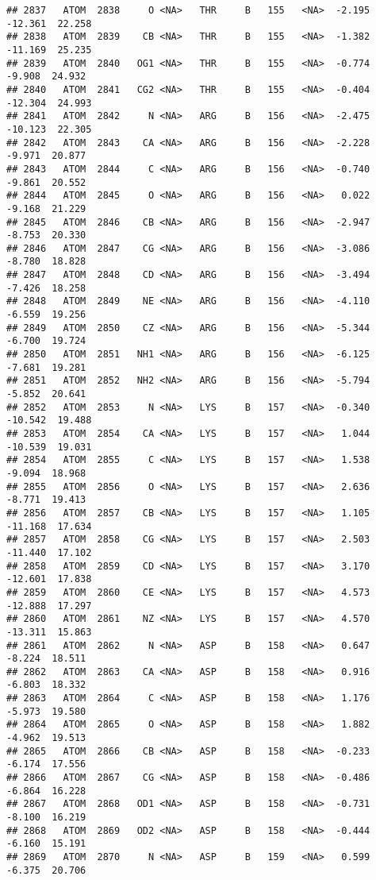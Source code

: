 \documentclass[
]{article}
\begin{document}
\begin{verbatim}
## 2837   ATOM  2838     O <NA>   THR     B   155   <NA>  -2.195 -12.361  22.258
## 2838   ATOM  2839    CB <NA>   THR     B   155   <NA>  -1.382 -11.169  25.235
## 2839   ATOM  2840   OG1 <NA>   THR     B   155   <NA>  -0.774  -9.908  24.932
## 2840   ATOM  2841   CG2 <NA>   THR     B   155   <NA>  -0.404 -12.304  24.993
## 2841   ATOM  2842     N <NA>   ARG     B   156   <NA>  -2.475 -10.123  22.305
## 2842   ATOM  2843    CA <NA>   ARG     B   156   <NA>  -2.228  -9.971  20.877
## 2843   ATOM  2844     C <NA>   ARG     B   156   <NA>  -0.740  -9.861  20.552
## 2844   ATOM  2845     O <NA>   ARG     B   156   <NA>   0.022  -9.168  21.229
## 2845   ATOM  2846    CB <NA>   ARG     B   156   <NA>  -2.947  -8.753  20.330
## 2846   ATOM  2847    CG <NA>   ARG     B   156   <NA>  -3.086  -8.780  18.828
## 2847   ATOM  2848    CD <NA>   ARG     B   156   <NA>  -3.494  -7.426  18.258
## 2848   ATOM  2849    NE <NA>   ARG     B   156   <NA>  -4.110  -6.559  19.256
## 2849   ATOM  2850    CZ <NA>   ARG     B   156   <NA>  -5.344  -6.700  19.724
## 2850   ATOM  2851   NH1 <NA>   ARG     B   156   <NA>  -6.125  -7.681  19.281
## 2851   ATOM  2852   NH2 <NA>   ARG     B   156   <NA>  -5.794  -5.852  20.641
## 2852   ATOM  2853     N <NA>   LYS     B   157   <NA>  -0.340 -10.542  19.488
## 2853   ATOM  2854    CA <NA>   LYS     B   157   <NA>   1.044 -10.539  19.031
## 2854   ATOM  2855     C <NA>   LYS     B   157   <NA>   1.538  -9.094  18.968
## 2855   ATOM  2856     O <NA>   LYS     B   157   <NA>   2.636  -8.771  19.413
## 2856   ATOM  2857    CB <NA>   LYS     B   157   <NA>   1.105 -11.168  17.634
## 2857   ATOM  2858    CG <NA>   LYS     B   157   <NA>   2.503 -11.440  17.102
## 2858   ATOM  2859    CD <NA>   LYS     B   157   <NA>   3.170 -12.601  17.838
## 2859   ATOM  2860    CE <NA>   LYS     B   157   <NA>   4.573 -12.888  17.297
## 2860   ATOM  2861    NZ <NA>   LYS     B   157   <NA>   4.570 -13.311  15.863
## 2861   ATOM  2862     N <NA>   ASP     B   158   <NA>   0.647  -8.224  18.511
## 2862   ATOM  2863    CA <NA>   ASP     B   158   <NA>   0.916  -6.803  18.332
## 2863   ATOM  2864     C <NA>   ASP     B   158   <NA>   1.176  -5.973  19.580
## 2864   ATOM  2865     O <NA>   ASP     B   158   <NA>   1.882  -4.962  19.513
## 2865   ATOM  2866    CB <NA>   ASP     B   158   <NA>  -0.233  -6.174  17.556
## 2866   ATOM  2867    CG <NA>   ASP     B   158   <NA>  -0.486  -6.864  16.228
## 2867   ATOM  2868   OD1 <NA>   ASP     B   158   <NA>  -0.731  -8.100  16.219
## 2868   ATOM  2869   OD2 <NA>   ASP     B   158   <NA>  -0.444  -6.160  15.191
## 2869   ATOM  2870     N <NA>   ASP     B   159   <NA>   0.599  -6.375  20.706

\end{verbatim}
\end{document}
